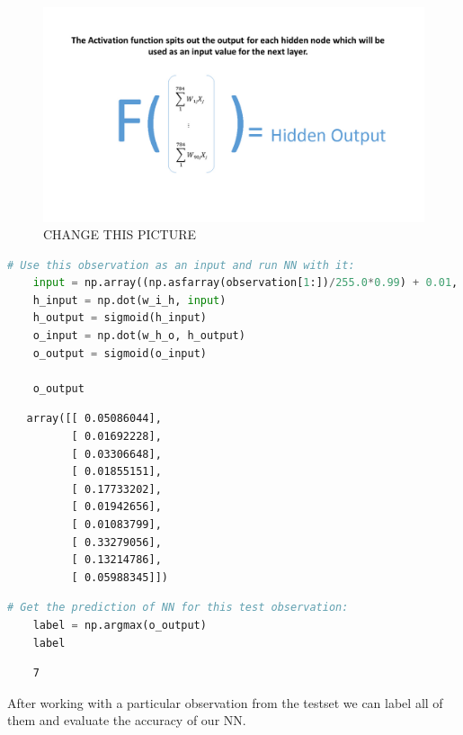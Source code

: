 \begin{figure}[H]
    \includegraphics[width=\linewidth]{pics/activation.jpg}
    \caption{\label{fig:bp} CHANGE THIS PICTURE}
\end{figure}

\begin{lstlisting}[language=Python]
    # Use this observation as an input and run NN with it:
    input = np.array((np.asfarray(observation[1:])/255.0*0.99) + 0.01, ndmin=2).T
    h_input = np.dot(w_i_h, input)
    h_output = sigmoid(h_input)
    o_input = np.dot(w_h_o, h_output)
    o_output = sigmoid(o_input)
    
    o_output
\end{lstlisting}

\begin{lstlisting}
   array([[ 0.05086044],
          [ 0.01692228],
          [ 0.03306648],
          [ 0.01855151],
          [ 0.17733202],
          [ 0.01942656],
          [ 0.01083799],
          [ 0.33279056],
          [ 0.13214786],
          [ 0.05988345]])
\end{lstlisting}

\begin{lstlisting}[language=Python]
    # Get the prediction of NN for this test observation:
    label = np.argmax(o_output)
    label
\end{lstlisting}

\begin{lstlisting}
    7
\end{lstlisting}

After working with a particular observation from the testset we can label all of them and evaluate the accuracy of our NN.

